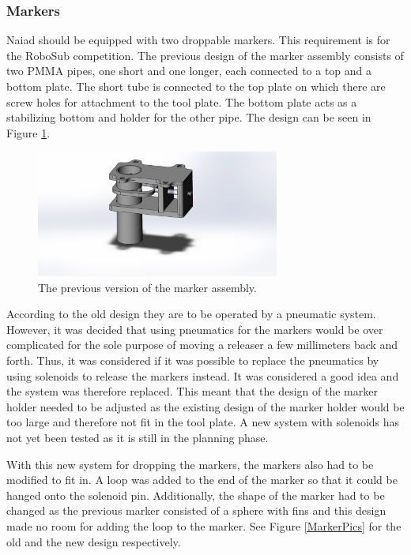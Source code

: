 \subsubsection{Markers}
	\noindent Naiad should be equipped with two droppable markers. This requirement is for the RoboSub competition. The previous design of the marker assembly consists of two PMMA pipes, one short and one longer, each connected to a top and a bottom plate. The short tube is connected to the top plate on which there are screw holes for attachment to the tool plate. The bottom plate acts as a stabilizing bottom and holder for the other pipe. The design can be seen in Figure \ref{helluuu}. 
	
	\begin{figure}[!ht]
	\begin{center}
		\includegraphics[width=80mm]{./Images/Mechanics/Markerassem3.jpg}
		\caption{The previous version of the marker assembly.}
		\label{helluuu}
	\end{center}
\end{figure}

According to the old design they are to be operated by a pneumatic system. However, it was decided that using pneumatics for the markers would be over complicated for the sole purpose of moving a releaser a few millimeters back and forth. Thus, it was considered if it was possible to replace the pneumatics by using solenoids to release the markers instead. It was considered a good idea and the system was therefore replaced. This meant that the design of the marker holder needed to be adjusted as the existing design of the marker holder would be too large and therefore not fit in the tool plate. A new system with solenoids has not yet been tested as it is still in the planning phase.  

With this new system for dropping the markers, the markers also had to be modified to fit in. A loop was added to the end of the marker so that it could be hanged onto the solenoid pin. Additionally, the shape of the marker had to be changed as the previous marker consisted of a sphere with fins and this design made no room for adding the loop to the marker. See Figure \ref{MarkerPics} for the old and the new design respectively.

